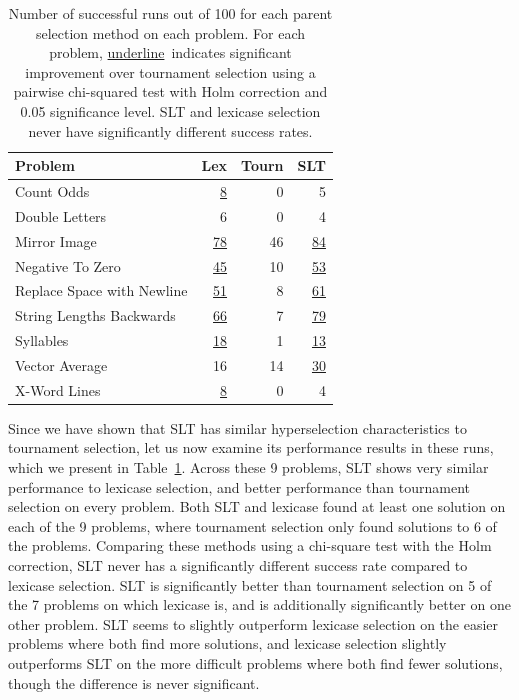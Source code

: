 \documentclass{sig-alternate}
\begin{document}
\begin{table}[t]
\centering
\caption{Number of successful runs out of 100 for each parent selection method on each problem. For each problem, \underline{underline}~indicates significant improvement over tournament selection using a pairwise chi-squared test with Holm correction and 0.05 significance level. SLT and lexicase selection never have significantly different success rates.}
\label{table:slt-results}
\begin{tabular}{lrrr}
\toprule
\textbf{Problem}                    & \textbf{Lex} & \textbf{Tourn} & \textbf{SLT} \\
\midrule
Count Odds                 & \underline{8}        & 0          & 5   \\
Double Letters             & 6        & 0          & 4   \\
Mirror Image               & \underline{78}       & 46         & \underline{84}  \\
Negative To Zero           & \underline{45}       & 10         & \underline{53}  \\
Replace Space with Newline & \underline{51}       & 8          & \underline{61}  \\
String Lengths Backwards   & \underline{66}       & 7          & \underline{79}  \\
Syllables                  & \underline{18}       & 1          & \underline{13}  \\
Vector Average             & 16       & 14         & \underline{30}  \\
X-Word Lines               & \underline{8}        & 0          & 4   \\
\bottomrule
\end{tabular}
\end{table}

Since we have shown that SLT has similar hyperselection characteristics to tournament selection, let us now examine its performance results in these runs, which we present in Table~\ref{table:slt-results}. Across these 9 problems, SLT shows very similar performance to lexicase selection, and better performance than tournament selection on every problem. Both SLT and lexicase found at least one solution on each of the 9 problems, where tournament selection only found solutions to 6 of the problems. Comparing these methods using a chi-square test with the Holm correction, SLT never has a significantly different success rate compared to lexicase selection. SLT is significantly better than tournament selection on 5 of the 7 problems on which lexicase is, and is additionally significantly better on one other problem.
 SLT seems to slightly outperform lexicase selection on the easier problems where both find more solutions, and lexicase selection slightly outperforms SLT on the more difficult problems where both find fewer solutions, though the difference is never significant.
\end{document}
